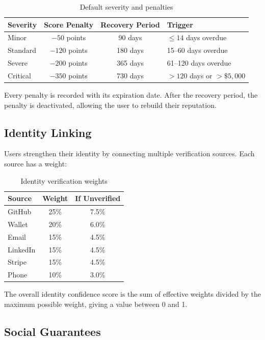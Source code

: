 \documentclass[12pt, a4paper]{article}
\begin{document}
\begin{table}[H]
\centering
\caption{Default severity and penalties}
\begin{tabular}{l c c l}
\toprule
\textbf{Severity} & \textbf{Score Penalty} & \textbf{Recovery Period} & \textbf{Trigger} \\
\midrule
Minor & $-50$ points & 90 days & $\leq 14$ days overdue \\
Standard & $-120$ points & 180 days & 15--60 days overdue \\
Severe & $-200$ points & 365 days & 61--120 days overdue \\
Critical & $-350$ points & 730 days & $>120$ days or $>\$5,000$ \\
\bottomrule
\end{tabular}
\end{table}

Every penalty is recorded with its expiration date. After the recovery period, the penalty is deactivated, allowing the user to rebuild their reputation.

\subsection{Identity Linking}

Users strengthen their identity by connecting multiple verification sources. Each source has a weight:

\begin{table}[H]
\centering
\caption{Identity verification weights}
\begin{tabular}{l c c}
\toprule
\textbf{Source} & \textbf{Weight} & \textbf{If Unverified} \\
\midrule
GitHub & 25\% & 7.5\% \\
Wallet & 20\% & 6.0\% \\
Email & 15\% & 4.5\% \\
LinkedIn & 15\% & 4.5\% \\
Stripe & 15\% & 4.5\% \\
Phone & 10\% & 3.0\% \\
\bottomrule
\end{tabular}
\end{table}

The overall identity confidence score is the sum of effective weights divided by the maximum possible weight, giving a value between 0 and 1.

\subsection{Social Guarantees}
\end{document}
